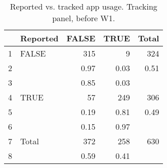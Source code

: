 \begin{table}[h!]
\centering
\caption{Reported vs. tracked app usage. Tracking panel, before W1.} 
\label{tab:appuse-reported-vs-tracked}
\begingroup\small
\begin{tabular}{llrrr}
  \toprule
 & Reported & FALSE & TRUE & Total \\ 
  \midrule
1 & FALSE & 315 & 9 & 324 \\ 
  2 &   & 0.97 & 0.03 & 0.51 \\ 
  3 &   & 0.85 & 0.03 &  \\ 
  4 & TRUE & 57 & 249 & 306 \\ 
  5 &   & 0.19 & 0.81 & 0.49 \\ 
  6 &   & 0.15 & 0.97 &  \\ 
  7 & Total & 372 & 258 & 630 \\ 
  8 &  & 0.59 & 0.41 &  \\ 
   \bottomrule
\end{tabular}
\endgroup
\end{table}
